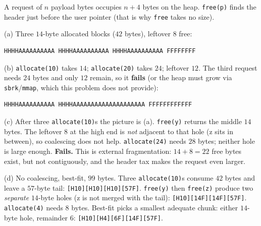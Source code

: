 \documentclass[11pt,a4paper]{article}
\newenvironment{Sol}{%
  \begin{tcolorbox}[sboxstyle, title={Solution}]%
}{%
  \end{tcolorbox}\vspace{0.35em}%
}
\begin{document}
\begin{Sol}
A request of $n$ payload bytes occupies $n+4$ bytes on the heap.
\texttt{free(p)} finds the header just before the user pointer (that
is why \texttt{free} takes no size).

(a) Three $14$-byte allocated blocks ($42$ bytes), leftover $8$ free:
\begin{lstlisting}[numbers=none]
HHHHAAAAAAAAAA HHHHAAAAAAAAAA HHHHAAAAAAAAAA FFFFFFFF
\end{lstlisting}

(b) \texttt{allocate(10)} takes $14$; \texttt{allocate(20)} takes
$24$; leftover $12$. The third request needs $24$ bytes and only $12$
remain, so it \textbf{fails} (or the heap must grow via
\texttt{sbrk}/\texttt{mmap}, which this problem does not provide):
\begin{lstlisting}[numbers=none]
HHHHAAAAAAAAAA HHHHAAAAAAAAAAAAAAAAAAAA FFFFFFFFFFFF
\end{lstlisting}

(c) After three \texttt{allocate(10)}s the picture is (a).
\texttt{free(y)} returns the middle $14$ bytes. The leftover $8$ at
the high end is \emph{not} adjacent to that hole (z sits in between),
so coalescing does not help. \texttt{allocate(24)} needs $28$ bytes;
neither hole is large enough. \textbf{Fails.} This is external
fragmentation: $14+8=22$ free bytes exist, but not contiguously, and
the header tax makes the request even larger.

(d) No coalescing, best-fit, $99$ bytes.
Three \texttt{allocate(10)}s consume $42$ bytes and leave a $57$-byte
tail:
\texttt{[H10][H10][H10][57F]}.
\texttt{free(y)} then \texttt{free(z)} produce two \emph{separate}
$14$-byte holes (z is not merged with the tail):
\texttt{[H10][14F][14F][57F]}.
\texttt{allocate(4)} needs $8$ bytes. Best-fit picks a smallest
adequate chunk: either $14$-byte hole, remainder $6$:
\texttt{[H10][H4][6F][14F][57F]}.
\end{Sol}
\end{document}
